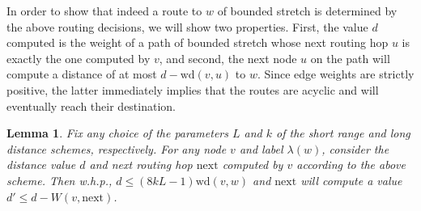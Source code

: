 \documentclass[letterpaper,11pt]{article}
\newtheorem{lemma}[theorem]{Lemma}
\newcommand{\Next}{\mathrm{next}}
\newcommand{\Wd}{\mathrm{wd}}
\begin{document}
In order to show that indeed a route to $w$ of bounded stretch is determined by
the above routing decisions, we will show two properties. First, the value $d$
computed is the weight of a path of bounded stretch whose next routing hop $u$
is exactly the one computed by $v$, and second, the next node $u$ on the path
will compute a distance of at most $d-\Wd(v,u)$ to $w$. Since edge weights
are strictly positive, the latter immediately implies that the routes are
acyclic and will eventually reach their destination.
\begin{lemma}\label{lemma:d}
Fix any choice of the parameters $L$ and $k$ of the short range and long
distance schemes, respectively. For any node $v$ and label $\lambda(w)$,
consider the distance value $d$ and next routing hop $\Next$ computed by $v$
according to the above scheme. Then w.h.p., $d\leq (8kL-1)\Wd(v,w)$ and $\Next$
will compute a value $d'\leq d-W(v,\Next)$.
\end{lemma}
\end{document}
